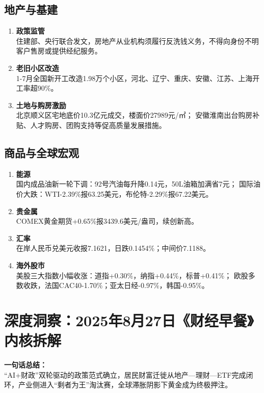 \subsection{地产与基建}
\begin{enumerate}[leftmargin=*, nosep]
    \item \textbf{政策监管}  \\
    住建部、央行联合发文，房地产从业机构须履行反洗钱义务，不得向身份不明客户售房或提供经纪服务。
    \item \textbf{老旧小区改造}  \\
    1-7月全国新开工改造1.98万个小区，河北、辽宁、重庆、安徽、江苏、上海开工率超90\%。
    \item \textbf{土地与购房激励}  \\
    北京顺义区宅地底价10.3亿元成交，楼面价27989元/㎡；  
    安徽淮南出台购房补贴、人才购房、团购支持等促高质量发展措施。
\end{enumerate}

\subsection{商品与全球宏观}
\begin{enumerate}[leftmargin=*, nosep]
    \item \textbf{能源}  \\
    国内成品油新一轮下调：92号汽油每升降0.14元，50L油箱加满省7元；  
    国际油价大跌：WTI-2.39\%报63.25美元，布伦特-2.29\%报67.22美元。
    \item \textbf{贵金属}  \\
    COMEX黄金期货+0.65\%报3439.6美元/盎司，续创新高。
    \item \textbf{汇率}  \\
    在岸人民币兑美元收报7.1621，日跌0.1454\%；中间价7.1188。
    \item \textbf{海外股市}  \\
    美股三大指数小幅收涨：道指+0.30\%，纳指+0.44\%，标普+0.41\%；  
    欧股多数收跌，法国CAC40-1.70\%；亚太日经-0.97\%，韩国-0.95\%。
\end{enumerate}

\clearpage

\section{深度洞察：2025年8月27日《财经早餐》内核拆解}
\textbf{一句话总结：}  \\
“AI+财政”双轮驱动的政策范式确立，居民财富迁徙从地产—理财—ETF完成闭环，产业侧进入“剩者为王”淘汰赛，全球滞胀阴影下黄金成为终极押注。

